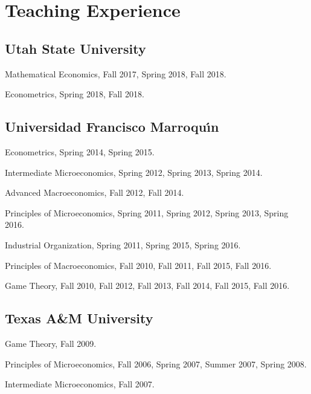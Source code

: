 \documentclass{article}%
\renewenvironment{itemize}{
\begin{list}{}{
\setlength{\leftmargin}{1.5em}
}
}{
\end{list}
}
\begin{document}
\section*{Teaching Experience}

\subsection*{Utah State University}
\begin{itemize}
\item Mathematical Economics, Fall 2017, Spring 2018, Fall 2018.
\item Econometrics, Spring 2018, Fall 2018. 
\end{itemize}


\subsection*{Universidad Francisco Marroqu\'{\i}n}

\begin{itemize}

\item Econometrics, Spring 2014, Spring 2015.

\item Intermediate Microeconomics, Spring 2012, Spring 2013, Spring 2014.

\item Advanced Macroeconomics, Fall 2012, Fall 2014.

\item Principles of Microeconomics, Spring 2011, Spring 2012, Spring 2013, Spring 2016.

\item Industrial Organization, Spring 2011, Spring 2015, Spring 2016.

\item Principles of Macroeconomics, Fall 2010, Fall 2011, Fall 2015, Fall 2016.

\item Game Theory, Fall 2010, Fall 2012, Fall 2013, Fall 2014, Fall 2015, Fall 2016.
\end{itemize}

\subsection*{Texas A\&M University}

\begin{itemize}
\item Game Theory, Fall 2009.

\item Principles of Microeconomics, Fall 2006, Spring 2007, Summer 2007, Spring 2008.

\item Intermediate Microeconomics, Fall 2007.
\end{itemize}
\end{document}
